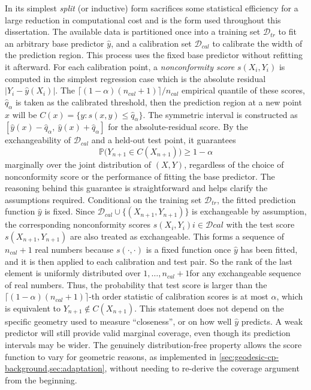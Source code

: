 In its simplest \emph{split} (or inductive) form \citep{lei2018} sacrifices some statistical efficiency for a large reduction in computational cost and is the form used throughout this dissertation. The available data is partitioned once into a training set $\mathcal{D}_{tr}$ to fit an arbitrary base predictor $\hat y$, and a calibration set $\mathcal{D}_{cal}$ to calibrate the width of the prediction region. This process uses the fixed base predictor without refitting it afterward. For each calibration point, a \emph{nonconformity score} $s(X_i,Y_i)$ is computed in the simplest regression case which is the absolute residual $|Y_i - \hat y(X_i)|$.  The $\lceil (1-\alpha)(n_{cal}+1)\rceil / n_{cal}$ empirical quantile of these scores, $\hat q_\alpha$ is taken as the calibrated threshold, then the prediction region at a new point $x$ will be $C(x) = \{y : s(x,y) \le \hat q_\alpha\}$. The symmetric interval is constructed as $[\hat y(x) - \hat q_\alpha,\ \hat y(x) + \hat q_\alpha]$ for the absolute-residual score. By the exchangeability of $\mathcal{D}_{cal}$ and a held-out test point, it guarantees
\begin{equation}
    \mathbb{P}\big(Y_{n+1} \in C(X_{n+1})\big) \ge 1 - \alpha
\end{equation}
marginally over the joint distribution of $(X,Y)$, regardless of the choice of nonconformity score or the performance of fitting the base predictor. The reasoning behind this guarantee is straightforward and helps clarify the assumptions required. Conditional on the training set $\mathcal{D}_{tr}$, the fitted prediction function $\hat y$ is fixed. Since $\mathcal{D}_{cal}\cup\{(X_{n+1},Y_{n+1})\}$ is exchangeable by assumption, the corresponding nonconformity scores ${s(X_i,Y_i)}{i\in\mathcal{D}{cal}}$ with the test score $s(X_{n+1},Y_{n+1})$ are also treated as exchangeable. This forms a sequence of $n_{cal}+1$ real numbers because $s(\cdot,\cdot)$ is a fixed function once $\hat y$ has been fitted, and it is then applied to each calibration and test pair. So the rank of the last element is uniformly distributed over ${1,\dots,n_{cal}+1}$for any exchangeable sequence of real numbers. Thus, the probability that test score is larger than the $\lceil(1-\alpha)(n_{cal}+1)\rceil$-th order statistic of calibration scores is at most $\alpha$, which is equivalent to $Y_{n+1}\notin C(X_{n+1})$. This statement does not depend on the specific geometry used to measure ``closeness'', or on how well $\hat y$ predicts. A weak predictor will still provide valid marginal coverage, even though its prediction intervals may be wider. The genuinely distribution-free property allows the score function to vary for geometric reasons, as implemented in \cref{sec:geodesic-cp-background,sec:adaptation}, without needing to re-derive the coverage argument from the beginning.

